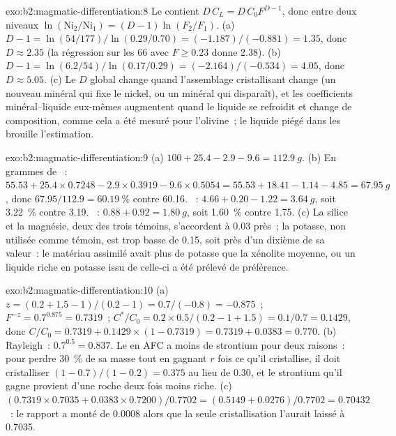 \begin{solution}{exo:b2:magmatic-differentiation:8}
Le  contient $D\,C_L = D\,C_0F^{D-1}$, donc entre deux niveaux
$\ln(\mathrm{Ni}_2/\mathrm{Ni}_1) = (D - 1)\ln(F_2/F_1)$. (a) $D - 1 = \ln(54/177)/
\ln(0.29/0.70) = (-1.187)/(-0.881) = 1.35$, donc $D \approx 2.35$ (la régression sur les
66  avec $F \ge 0.23$ donne 2.38). (b) $D - 1 = \ln(6.2/54)/\ln(0.17/0.29) = (-2.164)/(-0.534)
= 4.05$, donc $D \approx 5.05$. (c) Le $D$ global change quand l'assemblage cristallisant change
(un nouveau minéral qui fixe le nickel, ou un minéral qui disparaît), et les coefficients
minéral--liquide eux-mêmes augmentent quand le liquide se refroidit et change de composition,
comme cela a été mesuré pour l'olivine~; le liquide piégé dans les  brouille
l'estimation.
\end{solution}

\begin{solution}{exo:b2:magmatic-differentiation:9}
(a) $100 + 25.4 - 2.9 - 9.6 = \qty{112.9}{g}$. (b) En grammes de ~: $55.53 +
25.4\times0.7248 - 2.9\times0.3919 - 9.6\times0.5054 = 55.53 + 18.41 - 1.14 - 4.85 =
\qty{67.95}{g}$, donc $67.95/112.9 = \qty{60.19}{\percent}$ contre 60.16. ~:
$4.66 + 0.20 - 1.22 = \qty{3.64}{g}$, soit \qty{3.22}{\percent} contre 3.19. ~:
$0.88 + 0.92 = \qty{1.80}{g}$, soit \qty{1.60}{\percent} contre 1.75. (c) La silice et la magnésie, deux des trois
témoins, s'accordent à 0.03 près~; la potasse, non utilisée comme témoin, est trop basse de 0.15,
soit près d'un dixième de sa valeur~: le matériau assimilé avait plus de potasse que la xénolite moyenne,
ou un liquide riche en potasse issu de celle-ci a été prélevé de préférence.
\end{solution}

\begin{solution}{exo:b2:magmatic-differentiation:10}
(a) $z = (0.2 + 1.5 - 1)/(0.2 - 1) = 0.7/(-0.8) = -0.875$~; $F^{-z} = 0.7^{0.875} =
0.7319$~; $C^*/C_0 = 0.2\times0.5/(0.2 - 1 + 1.5) = 0.1/0.7 = 0.1429$, donc $C/C_0 =
0.7319 + 0.1429\times(1 - 0.7319) = 0.7319 + 0.0383 = 0.770$. (b) Rayleigh~:
$0.7^{0.5} = 0.837$. Le  en AFC a moins de strontium pour deux raisons~: pour perdre
\qty{30}{\percent} de sa masse tout en gagnant $r$ fois ce qu'il cristallise, il doit cristalliser
$(1 - 0.7)/(1 - 0.2) = 0.375$ au lieu de 0.30, et le strontium qu'il gagne
provient d'une roche deux fois moins riche. (c) $(0.7319\times0.7035 + 0.0383\times0.7200)/0.7702
= (0.5149 + 0.0276)/0.7702 = 0.70432$~: le rapport a monté de 0.0008
alors que la seule cristallisation l'aurait laissé à 0.7035.
\end{solution}

